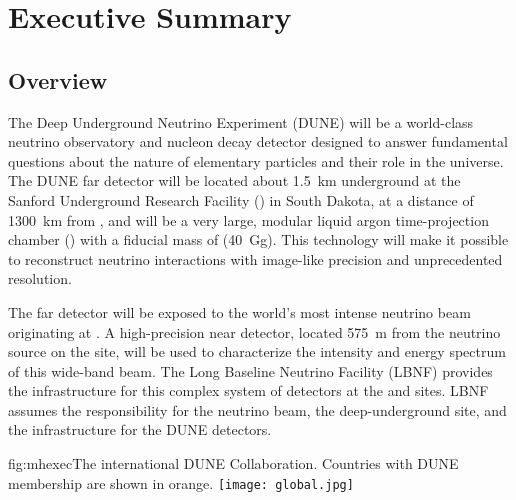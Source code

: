 \chapter{Executive Summary }
\label{ch:project-overview}
\section{Overview}
The Deep Underground Neutrino Experiment (DUNE) will be a world-class neutrino observatory and nucleon decay detector designed
to answer fundamental questions about the nature of elementary particles and their role in the universe. 
The DUNE far detector will be located about \SI{1.5}{km} underground at the Sanford Underground Research 
Facility (\surf) in South Dakota, at a distance of \SI{1300}{\km} from \fnal, and
will be a very large, modular liquid argon time-projection chamber (\lartpc) with a fiducial mass of \fdfiducialmass (\SI{40}{\giga\gram}). 
This \lar  technology will make it possible to reconstruct neutrino interactions with image-like precision
and unprecedented resolution.

The far detector will be exposed to
the world's most intense neutrino beam originating at  \fnal. 
A high-precision near detector, located \SI{575}{m} from the neutrino source on the  \fnal site, will be used to characterize the intensity and energy spectrum of this wide-band beam. 
The Long Baseline Neutrino Facility (LBNF) provides the infrastructure for this complex system of detectors at the  \fnal and \surf sites.
LBNF assumes the responsibility for the neutrino beam, 
the deep-underground site, and the infrastructure for the DUNE detectors.


\begin{dunefigure}{fig:mhexec}{The international DUNE
Collaboration. Countries with DUNE membership are shown in orange.}
\texttt{[image: global.jpg]}
\label{fig:map}
\end{dunefigure}

